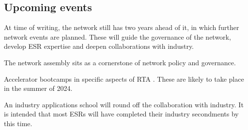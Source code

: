 \subsection{Upcoming events}
\label{upcoming}
At time of writing, the network still has two years ahead of it, in which further network events are planned. These will guide the governance of the network, develop ESR expertise and deepen collaborations with industry.\par
The network assembly sits as a cornerstone of network policy and governance.\par
Accelerator bootcamps in specific aspects of RTA . These are likely to take place in the summer of 2024.\par
An industry applications school will round off the collaboration with industry. It is intended that most ESRs will have completed their industry secondments by this time.

